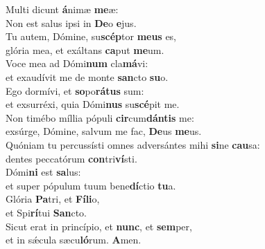 \evenverse Multi dicunt \textbf{á}nimæ \textbf{me}æ:~\*\\
\evenverse Non est salus ipsi in \textbf{De}o \textbf{e}jus.\\
\oddverse Tu autem, Dómine, su\textbf{scép}tor \textbf{me}\textbf{us} es,~\*\\
\oddverse glória mea, et exáltans \textbf{ca}put \textbf{me}um.\\
\evenverse Voce mea ad Dómi\textbf{num} cla\textbf{má}vi:~\*\\
\evenverse et exaudívit me de monte \textbf{san}cto \textbf{su}o.\\
\oddverse Ego dormívi, et \textbf{so}po\textbf{rá}\textbf{tus} sum:~\*\\
\oddverse et exsurréxi, quia Dómi\textbf{nus} su\textbf{scé}pit me.\\
\evenverse Non timébo míllia pópuli \textbf{cir}cum\textbf{dán}\textbf{tis} me:~\*\\
\evenverse exsúrge, Dómine, salvum me fac, \textbf{De}us \textbf{me}us.\\
\oddverse Quóniam tu percussísti omnes adversántes mihi \textbf{si}ne \textbf{cau}sa:~\*\\
\oddverse dentes peccatórum \textbf{con}tri\textbf{ví}sti.\\
\evenverse Dómi\textbf{ni} est \textbf{sa}lus:~\*\\
\evenverse et super pópulum tuum bene\textbf{dí}ctio \textbf{tu}a.\\
\oddverse Glória \textbf{Pa}tri, et \textbf{Fí}\textbf{li}o,~\*\\
\oddverse et Spi\textbf{rí}tui \textbf{San}cto.\\
\evenverse Sicut erat in princípio, et \textbf{nunc}, et \textbf{sem}per,~\*\\
\evenverse et in sǽcula sæcu\textbf{ló}rum. \textbf{A}men.\\
